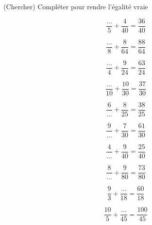  (Chercher) Compléter pour rendre l'égalité vraie

\begin{multicols}{5}
$$\dfrac{\dots}{5}+\dfrac{ 4}{40}=\dfrac{36}{40}$$

$$\dfrac{\dots}{8}+\dfrac{ 8}{64}=\dfrac{88}{64}$$

$$\dfrac{\dots}{4}+\dfrac{ 9}{24}=\dfrac{63}{24}$$

$$\dfrac{\dots}{10}+\dfrac{ 10}{30}=\dfrac{37}{30}$$

$$\dfrac{6}{\dots}+\dfrac{ 8}{25}=\dfrac{38}{25}$$

$$\dfrac{9}{\dots}+\dfrac{ 7}{30}=\dfrac{61}{30}$$

$$\dfrac{4}{\dots}+\dfrac{ 9}{40}=\dfrac{25}{40}$$

$$\dfrac{8}{\dots}+\dfrac{ 9}{80}=\dfrac{73}{80}$$

$$\dfrac{9}{3}+\dfrac{ \dots}{18}=\dfrac{60}{18}$$

$$\dfrac{10}{5}+\dfrac{ \dots}{45}=\dfrac{100}{45}$$

\end{multicols}